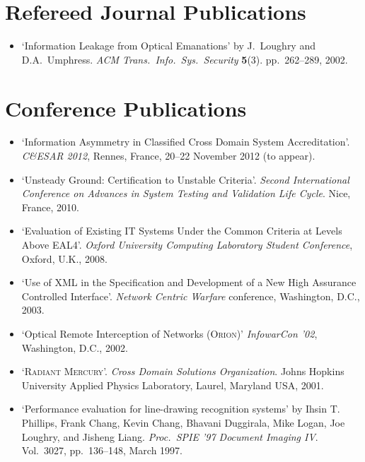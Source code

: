 \documentclass[letterpaper]{article}
\begin{document}
\section*{Refereed Journal Publications}

\begin{itemize}
    \item `Information Leakage from Optical Emanations' by J.\ Loughry
    and D.A.\ Umphress. \emph{ACM Trans.\ Info.\ Sys.\ Security} \textbf{5}(3).
    pp.\ 262--289, 2002.
\end{itemize}

\section*{Conference Publications}

\begin{itemize}
	\item `Information Asymmetry in Classified Cross Domain System Accreditation'.
		\emph{C\&ESAR 2012}, Rennes, France, 20--22 November 2012 (to appear).

	\item `Unsteady Ground: Certification to Unstable Criteria'.
		\emph{Second International Conference on Advances in System Testing
		and Validation Life Cycle}. Nice, France, 2010. 

	\item `Evaluation of Existing IT Systems Under the Common Criteria
		at Levels Above EAL4'. \emph{Oxford University
		Computing Laboratory Student Conference}, Oxford, U.K., 2008.

    \item `Use of XML in the Specification and Development of a New High
		Assurance Controlled Interface'. \emph{Network Centric Warfare} conference,
		Washington, D.C., 2003.

    \item `Optical Remote Interception of Networks (\textsc{Orion})'
		\emph{InfowarCon '02}, Washington, D.C., 2002.

    \item `\textsc{Radiant Mercury}'. \emph{Cross Domain Solutions
		Organization}. Johns Hopkins University Applied Physics Laboratory,
		Laurel, Maryland USA, 2001.

    \item `Performance evaluation for line-drawing recognition systems'
		by Ihsin T. Phillips, Frank Chang, Kevin Chang, Bhavani Duggirala,
		Mike Logan, Joe Loughry, and Jisheng Liang. \emph{Proc.\ SPIE '97
		Document Imaging IV}. Vol.\ 3027, pp.\ 136--148, March 1997.
\end{itemize}
\end{document}
